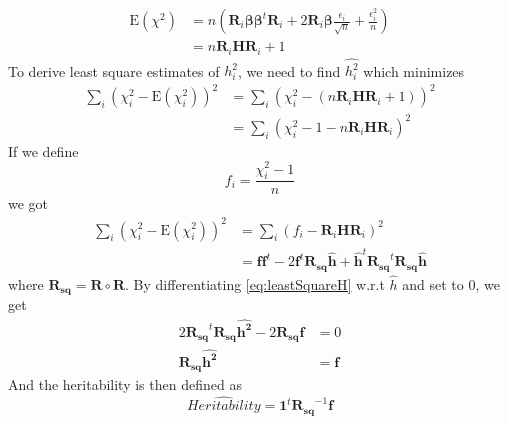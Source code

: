 \documentclass{book}
\begin{document}
			\begin{align*}
			\mathrm{E}(\chi^2) &= n(\boldsymbol{R}_i\boldsymbol{\beta\beta}^t\boldsymbol{R}_i+2\boldsymbol{R}_i\boldsymbol{\beta}\frac{\epsilon_i}{\sqrt{n}}+\frac{\epsilon_i^2}{n}) \\
			&= n\boldsymbol{R}_i\boldsymbol{H}\boldsymbol{R}_i+1
			\end{align*}
			To derive least square estimates of $h_i^2$, we need to find $\hat{h_i^2}$ which minimizes
			\begin{align*}
				\sum_i(\chi_i^2-\mathrm{E}(\chi_i^2))^2&=\sum_i(\chi_i^2-(n\boldsymbol{R}_i\boldsymbol{H}\boldsymbol{R}_i+1))^2 \\
				&=\sum_i(\chi_i^2-1-n\boldsymbol{R}_i\boldsymbol{H}\boldsymbol{R}_i)^2 
			\end{align*}
			If we define 
			\begin{equation}
			f_i= \frac{\chi_i^2-1}{n}
			\label{eq:defineF}
			\end{equation}
			we got
			\begin{align}
			\sum_i(\chi_i^2-\mathrm{E}(\chi_i^2))^2&=\sum_i(f_i-\boldsymbol{R}_i\boldsymbol{H}\boldsymbol{R}_i)^2 \nonumber\\
			&=\boldsymbol{ff}^t-2\boldsymbol{f}^t\boldsymbol{R_{sq}\hat{h}}+\boldsymbol{\hat{h}}^t\boldsymbol{R_{sq}}^t\boldsymbol{R_{sq}\hat{h}}
			\label{eq:leastSquareH}
			\end{align}
			where $\boldsymbol{R_{sq}} = \boldsymbol{R}\circ\boldsymbol{R}$.
			By differentiating \cref{eq:leastSquareH} w.r.t $\hat{h}$ and set to 0, we get
			\begin{align}
				2\boldsymbol{R_{sq}}^t\boldsymbol{R_{sq}}\boldsymbol{\hat{h^2}}-2\boldsymbol{R_{sq}f}&=0 \nonumber\\
				\boldsymbol{R_{sq}}\boldsymbol{\hat{h^2}} &=\boldsymbol{f}
				\label{eq:shrekEq}
			\end{align}
			And the heritability is then defined as 
			\begin{equation}
			\hat{Heritability} = \boldsymbol{1}^t\boldsymbol{R_{sq}}^{-1}\boldsymbol{f}
			\label{eq:fullShrek}
			\end{equation}
\end{document}
